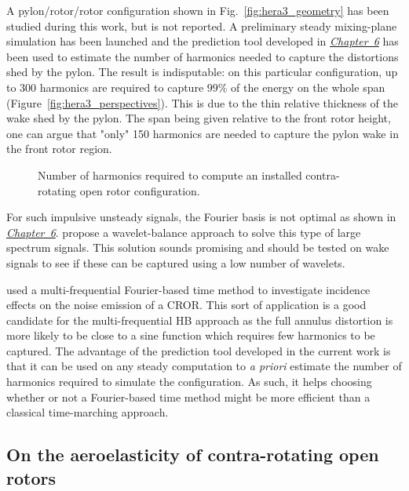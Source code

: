 A pylon/rotor/rotor configuration shown in Fig.~\ref{fig:hera3_geometry}
has been studied during this work, but is not reported.
A preliminary steady mixing-plane simulation has been
launched and the prediction tool developed in
\hyperref[cha:limitations_convergence]{\emph{Chapter~6}}
has been used to estimate the number
of harmonics needed to capture the distortions shed by the pylon.
The result is indisputable: on this particular configuration,
up to 300 harmonics are required to capture $99\%$ of the energy
on the whole span (Figure~\ref{fig:hera3_perspectives}). 
This is due to the thin relative thickness of the
wake shed by the pylon.
The span being given relative to the front
rotor height, one can argue that "only" 150 harmonics are
needed to capture the pylon wake in the front rotor region.
\begin{figure}[htp]
  \centering
  \caption{Number of harmonics required to compute an 
  installed contra-rotating open rotor configuration.}
\end{figure}

For such impulsive unsteady signals, the Fourier basis
is not optimal as shown in 
\hyperref[cha:limitations_convergence]{\emph{Chapter~6}}.
\citet{Li2002} propose a wavelet-balance approach to
solve this type of large spectrum signals. This
solution sounds promising and should be tested on
wake signals to see if these can be captured
using a low number of wavelets.

\citet{Ferrante2013} used a multi-frequential Fourier-based time
method to investigate incidence effects on the noise
emission of a CROR. This sort of application is a good candidate
for the multi-frequential HB approach as the full annulus
distortion is more likely to be close to a sine function which
requires few harmonics to be captured. The advantage of the
prediction tool developed in the current work is that
it can be used on any steady computation to \emph{a priori}
estimate the number of harmonics required to simulate the
configuration. As such, it helps choosing whether or not
a Fourier-based time method might be more efficient than
a classical time-marching approach.


\subsection*{On the aeroelasticity of contra-rotating open rotors}


